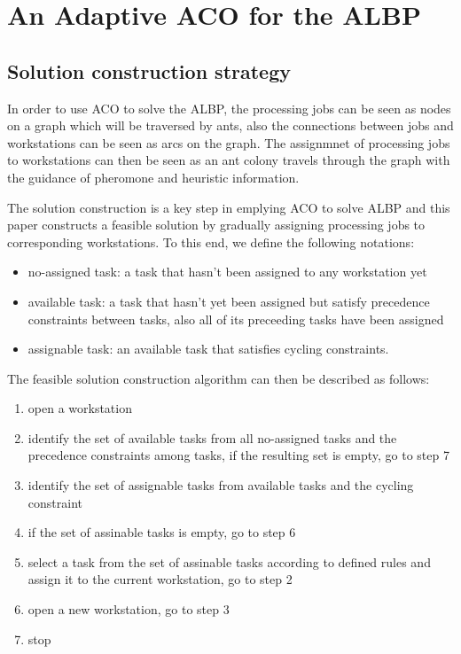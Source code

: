 \section{An Adaptive ACO for the ALBP}
\subsection{Solution construction strategy}
In order to use ACO to solve the ALBP, the processing jobs can be seen as nodes on a graph which will be traversed by ants, also the connections between jobs and workstations can be seen as arcs on the graph.
The assignmnet of processing jobs to workstations can then be seen as an ant colony travels through the graph with the guidance of pheromone and heuristic information.

The solution construction is a key step in emplying ACO to solve ALBP and this paper constructs a feasible solution by gradually assigning processing jobs to corresponding workstations.
To this end, we define the following notations:
\begin{itemize}
	\item no-assigned task: a task that hasn't been assigned to any workstation yet
	\item available task: a task that hasn't yet been assigned but satisfy precedence constraints between tasks, also all of its preceeding tasks have been assigned
	\item assignable task: an available task that satisfies cycling constraints.
\end{itemize}

The feasible solution construction algorithm can then be described as follows:
\begin{enumerate}
	\item open a workstation
	\item identify the set of available tasks from all no-assigned tasks and the precedence constraints among tasks, if the resulting set is empty, go to step 7
	\item identify the set of assignable tasks from available tasks and the cycling constraint
	\item if the set of assinable tasks is empty, go to step 6
	\item select a task from the set of assinable tasks according to defined rules and assign it to the current workstation, go to step 2
	\item open a new workstation, go to step 3
	\item stop
\end{enumerate}

